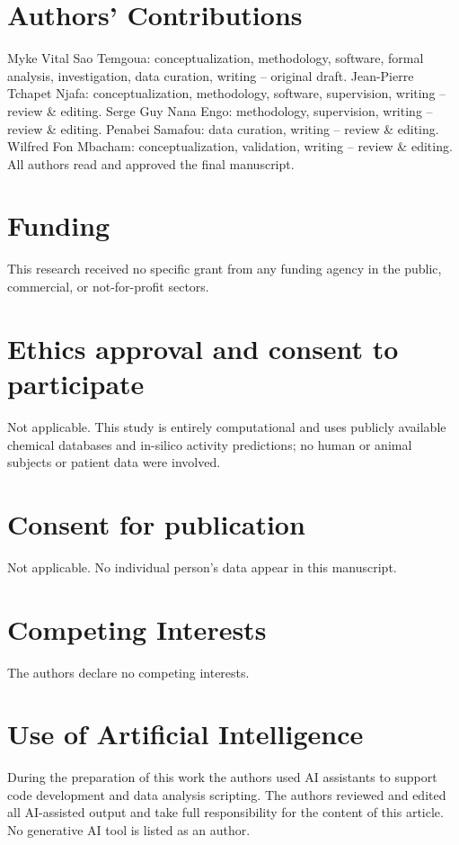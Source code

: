 \documentclass[11pt,a4paper]{article}
\begin{document}
\section*{Authors' Contributions}

Myke Vital Sao Temgoua: conceptualization, methodology, software, formal analysis, investigation, data curation, writing -- original draft. Jean-Pierre Tchapet Njafa: conceptualization, methodology, software, supervision, writing -- review \& editing. Serge Guy Nana Engo: methodology, supervision, writing -- review \& editing. Penabei Samafou: data curation, writing -- review \& editing. Wilfred Fon Mbacham: conceptualization, validation, writing -- review \& editing. All authors read and approved the final manuscript.

\section*{Funding}

This research received no specific grant from any funding agency in the public, commercial, or not-for-profit sectors.

\section*{Ethics approval and consent to participate}

Not applicable. This study is entirely computational and uses publicly available chemical databases and in-silico activity predictions; no human or animal subjects or patient data were involved.

\section*{Consent for publication}

Not applicable. No individual person's data appear in this manuscript.

\section*{Competing Interests}

The authors declare no competing interests.

\section*{Use of Artificial Intelligence}

During the preparation of this work the authors used AI assistants to support code development and data analysis scripting. The authors reviewed and edited all AI-assisted output and take full responsibility for the content of this article. No generative AI tool is listed as an author.




\end{document}
